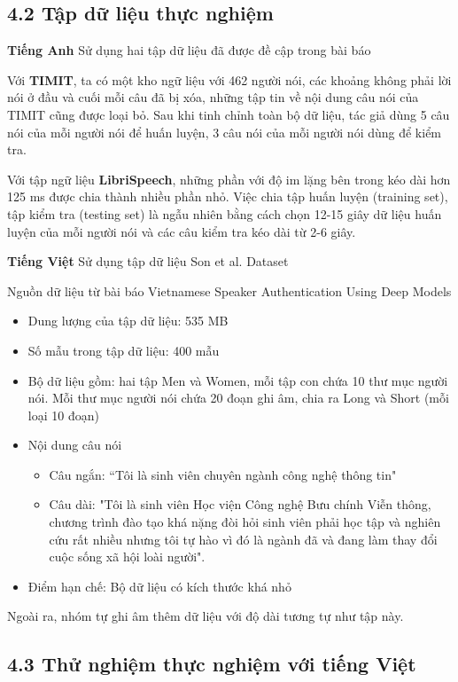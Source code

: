 \documentclass{article}
\begin{document}
	\subsection{4.2 Tập dữ liệu thực nghiệm}
	\qquad \textbf{Tiếng Anh} Sử dụng hai tập dữ liệu đã được đề cập trong bài báo

	Với \textbf{TIMIT}, ta có một kho ngữ liệu với 462 người nói, các khoảng không phải lời nói ở đầu và cuối mỗi câu đã bị xóa, những tập tin về nội dung câu nói của TIMIT cũng được loại bỏ. Sau khi tinh chỉnh toàn bộ dữ liệu, tác giả dùng 5 câu nói của mỗi người nói để huấn luyện, 3 câu nói của mỗi người nói dùng để kiểm tra.
	
	Với tập ngữ liệu \textbf{LibriSpeech}, những phần với độ im lặng bên trong kéo dài hơn 125 ms được chia thành nhiều phần nhỏ. Việc chia tập huấn luyện (training set), tập kiểm tra (testing set) là ngẫu nhiên bằng cách chọn 12-15 giây dữ liệu huấn luyện của mỗi người nói và các câu kiểm tra kéo dài từ 2-6 giây. 
	
	\textbf{Tiếng Việt} Sử dụng tập dữ liệu Son et al. Dataset
	
	Nguồn dữ liệu từ bài báo Vietnamese Speaker Authentication Using Deep Models
	\begin{itemize}
		\item Dung lượng của tập dữ liệu: 535 MB
		\item Số mẫu trong tập dữ liệu: 400 mẫu
		\item Bộ dữ liệu gồm: hai tập  Men và Women, mỗi tập con chứa 10 thư mục người nói. Mỗi thư mục người nói chứa 20 đoạn ghi âm, chia ra Long và Short (mỗi loại 10 đoạn) 
		\item Nội dung câu nói
		\begin{itemize}
			\item Câu ngắn: “Tôi là sinh viên chuyên ngành công nghệ thông tin"
			\item Câu dài: "Tôi là sinh viên Học viện Công nghệ Bưu chính Viễn thông, chương trình đào tạo khá nặng đòi hỏi sinh viên phải học tập và nghiên cứu rất nhiều nhưng tôi tự hào vì đó là ngành đã và đang làm thay đổi cuộc sống xã hội loài người".
		\end{itemize}
		\item Điểm hạn chế: Bộ dữ liệu có kích thước khá nhỏ
	\end{itemize}
	
	Ngoài ra, nhóm tự ghi âm thêm dữ liệu với độ dài tương tự như tập này.
	\subsection{4.3 Thử nghiệm thực nghiệm với tiếng Việt}
\end{document}
